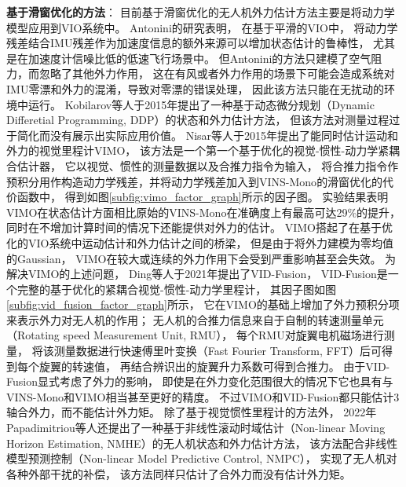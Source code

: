 \textbf{基于滑窗优化的方法}：
目前基于滑窗优化的无人机外力估计方法主要是将动力学模型应用到VIO系统中。
Antonini的研究\cite{antonini2018pre}表明，
在基于平滑的VIO中，
将动力学残差结合IMU残差作为加速度信息的额外来源可以增加状态估计的鲁棒性，
尤其是在加速度计信噪比低的低速飞行场景中。
但Antonini的方法只建模了空气阻力，而忽略了其他外力作用，
这在有风或者外力作用的场景下可能会造成系统对IMU零漂和外力的混淆，导致对零漂的错误处理\cite{abeywardena2014model}，
因此该方法只能在无扰动的环境中运行。
Kobilarov等人于2015年提出了一种基于动态微分规划（Dynamic Differetial Programming, DDP）的状态和外力估计方法\cite{kobilarov2015differential}，
但该方法对测量过程过于简化而没有展示出实际应用价值。
Nisar等人于2015年提出了能同时估计运动和外力的视觉里程计VIMO\cite{nisar2019vimo}，
该方法是一个第一个基于优化的视觉-惯性-动力学紧耦合估计器，
它以视觉、惯性的测量数据以及合推力指令为输入，
将合推力指令作预积分用作构造动力学残差，并将动力学残差加入到VINS-Mono\cite{qin2018vins}的滑窗优化的代价函数中，
得到如图\ref{subfig:vimo_factor_graph}所示的因子图。
实验结果表明VIMO在状态估计方面相比原始的VINS-Mono在准确度上有最高可达29\%的提升，
同时在不增加计算时间的情况下还能提供对外力的估计。
VIMO搭起了在基于优化的VIO系统中运动估计和外力估计之间的桥梁，
但是由于将外力建模为零均值的Gaussian，
VIMO在较大或连续的外力作用下会受到严重影响甚至会失效\cite{ding2021vid}。
为解决VIMO的上述问题，
Ding等人于2021年提出了VID-Fusion\cite{ding2021vid}，
VID-Fusion是一个完整的基于优化的紧耦合视觉-惯性-动力学里程计，
其因子图如图\ref{subfig:vid_fusion_factor_graph}所示，
它在VIMO的基础上增加了外力预积分项来表示外力对无人机的作用；
无人机的合推力信息来自于自制的转速测量单元（Rotating speed Measurement Unit, RMU），
每个RMU对旋翼电机磁场进行测量，
将该测量数据进行快速傅里叶变换（Fast Fourier Transform, FFT）后可得到每个旋翼的转速值，
再结合辨识出的旋翼升力系数可得到合推力。
由于VID-Fusion显式考虑了外力的影响，
即使是在外力变化范围很大的情况下它也具有与VINS-Mono和VIMO相当甚至更好的精度。
不过VIMO和VID-Fusion都只能估计3轴合外力，而不能估计外力矩。
除了基于视觉惯性里程计的方法外，
2022年Papadimitriou等人还提出了一种基于非线性滚动时域估计（Non-linear Moving Horizon Estimation, NMHE）的无人机状态和外力估计方法\cite{papadimitriou2022external}，
该方法配合非线性模型预测控制（Non-linear Model Predictive Control, NMPC），
实现了无人机对各种外部干扰的补偿，
该方法同样只估计了合外力而没有估计外力矩。

